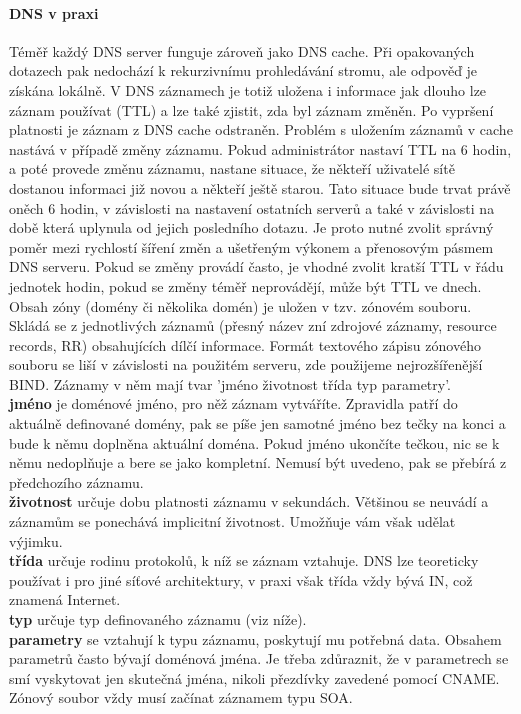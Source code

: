 \documentclass[10pt,a4paper]{article}
\begin{document}
\paragraph{DNS v praxi} Téměř každý DNS server funguje zároveň jako DNS cache. Při opakovaných dotazech pak nedochází k rekurzivnímu prohledávání stromu, ale odpověď je získána lokálně. V DNS záznamech je totiž uložena i informace jak dlouho lze záznam používat (TTL) a lze také zjistit, zda byl záznam změněn. Po vypršení platnosti je záznam z DNS cache odstraněn. Problém s uložením záznamů v cache nastává v případě změny záznamu. Pokud administrátor nastaví TTL na 6 hodin, a poté provede změnu záznamu, nastane situace, že někteří uživatelé sítě dostanou informaci již novou a někteří ještě starou. Tato situace bude trvat právě oněch 6 hodin, v závislosti na nastavení ostatních serverů a také v závislosti na době která uplynula od jejich posledního dotazu. Je proto nutné zvolit správný poměr mezi rychlostí šíření změn a ušetřeným výkonem a přenosovým pásmem DNS serveru. Pokud se změny provádí často, je vhodné zvolit kratší TTL v řádu jednotek hodin, pokud se změny téměř neprovádějí, může být TTL ve dnech. \\
Obsah zóny (domény či několika domén) je uložen v tzv. zónovém souboru. Skládá se z jednotlivých záznamů (přesný název zní zdrojové záznamy, resource records, RR) obsahujících dílčí informace. Formát textového zápisu zónového souboru se liší v závislosti na použitém serveru, zde použijeme nejrozšířenější BIND. Záznamy v něm mají tvar 'jméno životnost třída typ parametry'. \\
\textbf{jméno} je doménové jméno, pro něž záznam vytváříte. Zpravidla patří do aktuálně definované domény, pak se píše jen samotné jméno bez tečky na konci a bude k němu doplněna aktuální doména. Pokud jméno ukončíte tečkou, nic se k němu nedoplňuje a bere se jako kompletní. Nemusí být uvedeno, pak se přebírá z předchozího záznamu. \\
\textbf{životnost} určuje dobu platnosti záznamu v sekundách. Většinou se neuvádí a záznamům se ponechává implicitní životnost. Umožňuje vám však udělat výjimku. \\
\textbf{třída} určuje rodinu protokolů, k níž se záznam vztahuje. DNS lze teoreticky používat i pro jiné síťové architektury, v praxi však třída vždy bývá IN, což znamená Internet. \\
\textbf{typ} určuje typ definovaného záznamu (viz níže). \\
\textbf{parametry} se vztahují k typu záznamu, poskytují mu potřebná data. Obsahem parametrů často bývají doménová jména. Je třeba zdůraznit, že v parametrech se smí vyskytovat jen skutečná jména, nikoli přezdívky zavedené pomocí CNAME. \\
Zónový soubor vždy musí začínat záznamem typu SOA.\\
\end{document}
